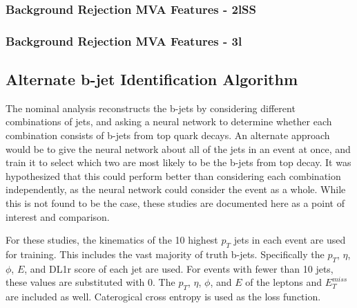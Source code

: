 \subsubsection{Background Rejection MVA Features - 2lSS}


\subsubsection{Background Rejection MVA Features - 3l}



\subsection{Alternate b-jet Identification Algorithm}
\label{subsec:topRecoApx}

The nominal analysis reconstructs the b-jets by considering different combinations of jets, and asking a neural network to determine whether each combination consists of b-jets from top quark decays. An alternate approach would be to give the neural network about all of the jets in an event at once, and train it to select which two are most likely to be the b-jets from top decay. It was hypothesized that this could perform better than considering each combination independently, as the neural network could consider the event as a whole. While this is not found to be the case, these studies are documented here as a point of interest and comparison.

For these studies, the kinematics of the 10 highest $p_T$ jets in each event are used for training. This includes the vast majority of truth b-jets. Specifically the $p_T$, $\eta$, $\phi$, $E$, and DL1r score of each jet are used. For events with fewer than 10 jets, these values are substituted with 0. The $p_T$, $\eta$, $\phi$, and $E$ of the leptons and $E_T^{miss}$ are included as well. Caterogical cross entropy is used as the loss function.

